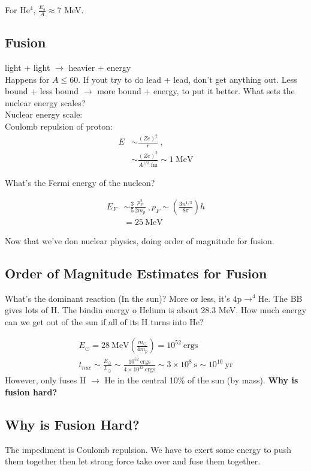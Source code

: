 \documentclass[10pt,a4paper]{article}
\newcommand{\ra}{\rightarrow}
\begin{document}
For He$^4$, $\frac{E_b}{A} \approx 7$ MeV. 

\subsection{Fusion}
light + light $\ra$ heavier + energy\\
Happens for $A \leq 60$. If yout try to do lead + lead, don't get anything out. Less bound + less bound $\ra$ more bound + energy, to put it better. What sets the nuclear energy scales? \\

Nuclear energy scale:\\
Coulomb repulsion of proton:\\
\begin{align}
E & \sim \frac{(Ze)^2}{r}~,\\
& \sim \frac{(Ze)^2}{A^{1/3} ~ \text{fm}} \sim 1 ~ \text{MeV}
\end{align}

What's the Fermi energy of the nucleon?

\begin{align}
E_F & \sim \frac{3}{5} \frac{p_F^2}{2 m_p}~, p_F \sim \left( \frac{3 n^{1/3}}{8 \pi} \right) h\\
& = 25 ~\text{MeV}
\end{align}

Now that we've don nuclear physics, doing order of magnitude for fusion.

\subsection{Order of Magnitude Estimates for Fusion}

What's the dominant reaction (In the sun)? More or less, it's $4 \text{p} \ra ^4$He. The BB gives lots of H. The bindin energy o Helium is about 28.3 MeV. How much energy can we get out of the sun if all of its H turns into He? 

\begin{align}
E_\odot = 28~\text{MeV} \left( \frac{m_\odot}{4m_p} \right) = 10^{52} ~\text{ergs}\\
t_{nuc} \sim \frac{E_\odot}{L_\odot} \sim \frac{10^{52}~\text{ergs}}{4 \times 10^{33} ~\text{ergs}} \sim 3 \times 10^8 ~ \text{s} \sim 10^{10} ~ \text{yr}
\end{align}
However,  only fuses H $\ra$ He in the central 10\% of the sun (by mass). \textbf{Why is fusion hard?}

\subsection{Why is Fusion Hard?}
The impediment is Coulomb repulsion. We have to exert some energy to push them together then let strong force take over and fuse them together. \\
\end{document}
